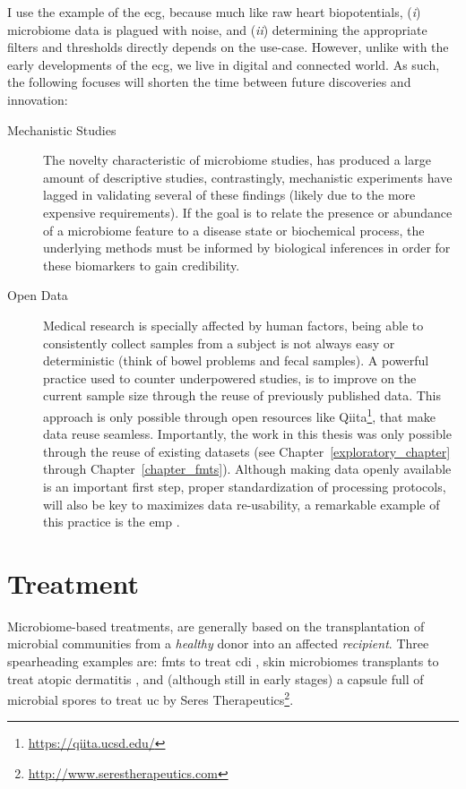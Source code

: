 I use the example of the \gls{ecg}, because much like raw heart biopotentials,
(\textit{i}) microbiome data is plagued with noise, and (\textit{ii})
determining the appropriate filters and thresholds directly depends on the
use-case. However, unlike with the early developments of the \gls{ecg}, we live
in digital and connected world. As such, the following focuses will
shorten the time between future discoveries and innovation:

\begin{description}
    \item[Mechanistic Studies]The novelty characteristic of microbiome studies, 
        has produced a large amount of descriptive studies, contrastingly, 
        mechanistic experiments have lagged in validating several of these 
        findings (likely due to the more expensive requirements).  If the goal 
        is to relate the presence or abundance of a microbiome feature to a
        disease state or biochemical process, the underlying methods must be 
        informed by biological inferences in order for these biomarkers to gain 
        credibility.

    \item[Open Data]Medical research is specially affected by human factors, 
        being able to consistently collect samples from a subject is not always 
        easy or deterministic (think of bowel problems and fecal samples). A 
        powerful practice used to counter underpowered studies, is to improve 
        on the current sample size through the reuse of previously published 
        data. This approach is only possible through open resources like 
        Qiita\footnote{\url{https://qiita.ucsd.edu/}}, that make data reuse 
        seamless. Importantly, the work in this thesis was only possible 
        through the reuse of existing datasets (see 
        Chapter~\ref{exploratory_chapter} through Chapter~\ref{chapter_fmts}).  
        Although making data openly available is an important first step, 
        proper standardization of processing protocols, will also be key to 
        maximizes data re-usability, a remarkable example of this practice is 
        the \gls{emp} \cite{RN4267}.
\end{description}

\section{Treatment}

Microbiome\hyp{}based treatments, are generally based on the transplantation of 
microbial communities from a \textit{healthy} donor into an affected 
\textit{recipient}. Three spearheading examples are: \glspl{fmt} to treat 
\gls{cdi} \cite{RN4129}, skin microbiomes transplants to treat atopic 
dermatitis \cite{GalloSkin}, and (although still in early stages) a capsule 
full of microbial spores to treat \gls{uc} by Seres 
Therapeutics\footnote{\url{http://www.serestherapeutics.com}}.

